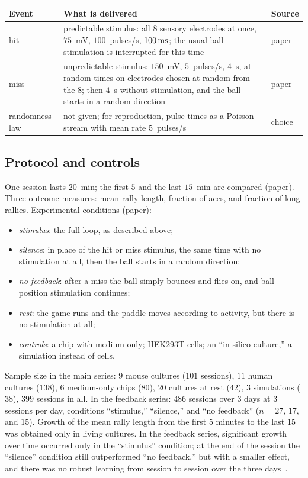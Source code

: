\begin{center}
\footnotesize
\setlength{\tabcolsep}{4pt}
\renewcommand{\arraystretch}{1.15}
\begin{tabular}{>{\raggedright}p{2.6cm}>{\raggedright}p{8.3cm}>{\raggedright\arraybackslash}p{1.6cm}}
\toprule
Event & What is delivered & Source \\
\midrule
hit & predictable stimulus: all $8$ sensory electrodes at once, $75$~mV, $100$~pulses/s, $100\,\text{ms}$; the usual ball stimulation is interrupted for this time & paper \\
miss & unpredictable stimulus: $150$~mV, $5$~pulses/s, $4$~s, at random times on electrodes chosen at random from the $8$; then $4$~s without stimulation, and the ball starts in a random direction & paper \\
randomness law & not given; for reproduction, pulse times as a Poisson stream with mean rate $5$~pulses/s & choice \\
\bottomrule
\end{tabular}
\end{center}

\subsection*{Protocol and controls}

One session lasts $20$~min; the first $5$ and the last $15$~min are compared (paper). Three outcome measures: mean rally length, fraction of aces, and fraction of long rallies. Experimental conditions (paper):
\begin{itemize}
\item \emph{stimulus}: the full loop, as described above;
\item \emph{silence}: in place of the hit or miss stimulus, the same time with no stimulation at all, then the ball starts in a random direction;
\item \emph{no feedback}: after a miss the ball simply bounces and flies on, and ball-position stimulation continues;
\item \emph{rest}: the game runs and the paddle moves according to activity, but there is no stimulation at all;
\item \emph{controls}: a chip with medium only; HEK293T cells; an ``in silico culture,'' a simulation instead of cells.
\end{itemize}
Sample size in the main series: $9$ mouse cultures ($101$ sessions), $11$ human cultures ($138$), $6$ medium-only chips ($80$), $20$ cultures at rest ($42$), $3$ simulations ($38$), $399$ sessions in all. In the feedback series: $486$ sessions over $3$ days at $3$ sessions per day, conditions ``stimulus,'' ``silence,'' and ``no feedback'' ($n=27$, $17$, and $15$). Growth of the mean rally length from the first $5$ minutes to the last $15$ was obtained only in living cultures. In the feedback series, significant growth over time occurred only in the ``stimulus'' condition; at the end of the session the ``silence'' condition still outperformed ``no feedback,'' but with a smaller effect, and there was no robust learning from session to session over the three days~\cite{Kagan2022}.

